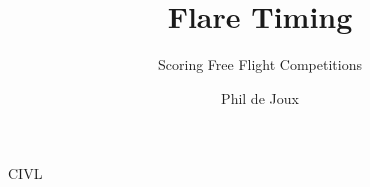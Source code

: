 \documentclass{beamer}
\title{Flare Timing}
\subtitle{Scoring Free Flight Competitions}
\author{Phil de Joux}
\institute{Block Scope}
\date{}
\begin{document}
\begin{frame}
\titlepage
\end{frame}

\begin{frame}
    CIVL
\end{frame}
\end{document}
